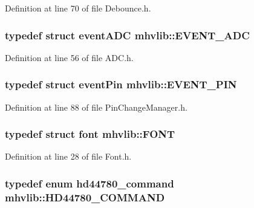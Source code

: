 Definition at line 70 of file Debounce.\-h.

\hypertarget{namespacemhvlib_ac219542e8f4858d30b5f6a025d7dd0dc}{
\subsubsection[{E\-V\-E\-N\-T\-\_\-\-A\-D\-C}]{\setlength{\rightskip}{0pt plus 5cm}typedef struct {\bf event\-A\-D\-C} {\bf mhvlib\-::\-E\-V\-E\-N\-T\-\_\-\-A\-D\-C}}}\label{namespacemhvlib_ac219542e8f4858d30b5f6a025d7dd0dc}


Definition at line 56 of file A\-D\-C.\-h.

\hypertarget{namespacemhvlib_acf4cd7c00d020d1fef8ecfe350328f3b}{
\subsubsection[{E\-V\-E\-N\-T\-\_\-\-P\-I\-N}]{\setlength{\rightskip}{0pt plus 5cm}typedef struct {\bf event\-Pin} {\bf mhvlib\-::\-E\-V\-E\-N\-T\-\_\-\-P\-I\-N}}}\label{namespacemhvlib_acf4cd7c00d020d1fef8ecfe350328f3b}


Definition at line 88 of file Pin\-Change\-Manager.\-h.

\hypertarget{namespacemhvlib_ac8cf789cdad5097b81a2d75dc08e6bfc}{
\subsubsection[{F\-O\-N\-T}]{\setlength{\rightskip}{0pt plus 5cm}typedef struct {\bf font} {\bf mhvlib\-::\-F\-O\-N\-T}}}\label{namespacemhvlib_ac8cf789cdad5097b81a2d75dc08e6bfc}


Definition at line 28 of file Font.\-h.

\hypertarget{namespacemhvlib_a810a3cc703298cdd5d00c913cb1bfec9}{
\subsubsection[{H\-D44780\-\_\-\-C\-O\-M\-M\-A\-N\-D}]{\setlength{\rightskip}{0pt plus 5cm}typedef enum {\bf hd44780\-\_\-command} {\bf mhvlib\-::\-H\-D44780\-\_\-\-C\-O\-M\-M\-A\-N\-D}}}\label{namespacemhvlib_a810a3cc703298cdd5d00c913cb1bfec9}


